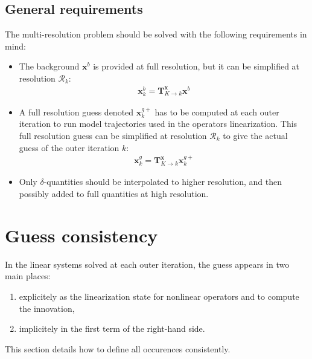 \documentclass[12pt]{scrartcl}
\begin{document}
\subsection{General requirements}
The multi-resolution problem should be solved with the following requirements in mind:
\begin{itemize}
\item The background $\mathbf{x}^b$ is provided at full resolution, but it can be simplified at resolution $\mathcal{R}_k$:
\begin{align}
\boxed{\mathbf{x}^b_k = \mathbf{T}^\mathbf{x}_{K \rightarrow k} \mathbf{x}^b}
\end{align}
\item A full resolution guess denoted $\mathbf{x}^{g+}_k$ has to be computed at each outer iteration to run model trajectories used in the operators linearization. This full resolution guess can be simplified at resolution $\mathcal{R}_k$ to give the actual guess of the outer iteration $k$:
\begin{align}
\boxed{\mathbf{x}^g_k = \mathbf{T}^\mathbf{x}_{K \rightarrow k} \mathbf{x}^{g+}_k}
\end{align}
\item Only $\delta$-quantities should be interpolated to higher resolution, and then possibly added to full quantities at high resolution.
\end{itemize}

\section{Guess consistency}

In the linear systems solved at each outer iteration, the guess appears in two main places:
\begin{enumerate}
\item explicitely as the linearization state for nonlinear operators and to compute the innovation,
\item implicitely in the first term of the right-hand side.
\end{enumerate}
This section details how to define all occurences consistently.
\end{document}
